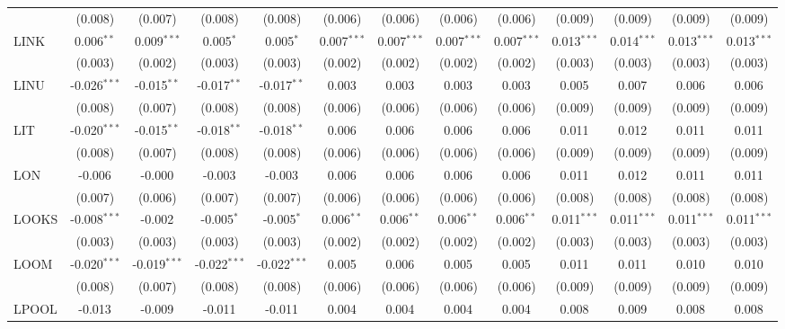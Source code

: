 \begin{table}[!htbp]
\begin{tabular}{@{\extracolsep{5pt}}lcccccccccccc}
  & (0.008) & (0.007) & (0.008) & (0.008) & (0.006) & (0.006) & (0.006) & (0.006) & (0.009) & (0.009) & (0.009) & (0.009) \\
 LINK & 0.006$^{**}$ & 0.009$^{***}$ & 0.005$^{*}$ & 0.005$^{*}$ & 0.007$^{***}$ & 0.007$^{***}$ & 0.007$^{***}$ & 0.007$^{***}$ & 0.013$^{***}$ & 0.014$^{***}$ & 0.013$^{***}$ & 0.013$^{***}$ \\
  & (0.003) & (0.002) & (0.003) & (0.003) & (0.002) & (0.002) & (0.002) & (0.002) & (0.003) & (0.003) & (0.003) & (0.003) \\
 LINU & -0.026$^{***}$ & -0.015$^{**}$ & -0.017$^{**}$ & -0.017$^{**}$ & 0.003$^{}$ & 0.003$^{}$ & 0.003$^{}$ & 0.003$^{}$ & 0.005$^{}$ & 0.007$^{}$ & 0.006$^{}$ & 0.006$^{}$ \\
  & (0.008) & (0.007) & (0.008) & (0.008) & (0.006) & (0.006) & (0.006) & (0.006) & (0.009) & (0.009) & (0.009) & (0.009) \\
 LIT & -0.020$^{***}$ & -0.015$^{**}$ & -0.018$^{**}$ & -0.018$^{**}$ & 0.006$^{}$ & 0.006$^{}$ & 0.006$^{}$ & 0.006$^{}$ & 0.011$^{}$ & 0.012$^{}$ & 0.011$^{}$ & 0.011$^{}$ \\
  & (0.008) & (0.007) & (0.008) & (0.008) & (0.006) & (0.006) & (0.006) & (0.006) & (0.009) & (0.009) & (0.009) & (0.009) \\
 LON & -0.006$^{}$ & -0.000$^{}$ & -0.003$^{}$ & -0.003$^{}$ & 0.006$^{}$ & 0.006$^{}$ & 0.006$^{}$ & 0.006$^{}$ & 0.011$^{}$ & 0.012$^{}$ & 0.011$^{}$ & 0.011$^{}$ \\
  & (0.007) & (0.006) & (0.007) & (0.007) & (0.006) & (0.006) & (0.006) & (0.006) & (0.008) & (0.008) & (0.008) & (0.008) \\
 LOOKS & -0.008$^{***}$ & -0.002$^{}$ & -0.005$^{*}$ & -0.005$^{*}$ & 0.006$^{**}$ & 0.006$^{**}$ & 0.006$^{**}$ & 0.006$^{**}$ & 0.011$^{***}$ & 0.011$^{***}$ & 0.011$^{***}$ & 0.011$^{***}$ \\
  & (0.003) & (0.003) & (0.003) & (0.003) & (0.002) & (0.002) & (0.002) & (0.002) & (0.003) & (0.003) & (0.003) & (0.003) \\
 LOOM & -0.020$^{***}$ & -0.019$^{***}$ & -0.022$^{***}$ & -0.022$^{***}$ & 0.005$^{}$ & 0.006$^{}$ & 0.005$^{}$ & 0.005$^{}$ & 0.011$^{}$ & 0.011$^{}$ & 0.010$^{}$ & 0.010$^{}$ \\
  & (0.008) & (0.007) & (0.008) & (0.008) & (0.006) & (0.006) & (0.006) & (0.006) & (0.009) & (0.009) & (0.009) & (0.009) \\
 LPOOL & -0.013$^{}$ & -0.009$^{}$ & -0.011$^{}$ & -0.011$^{}$ & 0.004$^{}$ & 0.004$^{}$ & 0.004$^{}$ & 0.004$^{}$ & 0.008$^{}$ & 0.009$^{}$ & 0.008$^{}$ & 0.008$^{}$ \\

\end{tabular}
\end{table}
